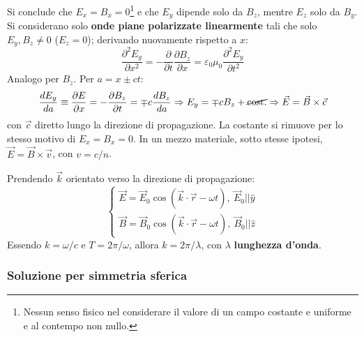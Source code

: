 \documentclass[a4paper]{scrartcl}
\numberwithin{equation}{subsection}
\theoremstyle{style1}
\begin{document}
Si conclude che $E_x=B_x = 0$\footnote{Nessun senso fisico nel considerare il valore di un campo costante e uniforme e al contempo non nullo.} e che $E_y$ dipende solo da $B_z$, mentre $E_z$ solo da $B_y$. Si considerano solo \textbf{onde piane polarizzate linearmente} tali che solo $E_y,B_z \neq 0$ ($E_z = 0$); derivando nuovamente rispetto a $x$:
\begin{equation}
	\frac{\partial ^2 E_y}{\partial x^2} = - \frac{\partial }{\partial t} \frac{\partial B_z}{\partial x} = \varepsilon _0 \mu _0 \frac{\partial ^2 E_y}{\partial t^2} 
\end{equation}
Analogo per $B_z$. Per $a=x\pm ct$:
\[
	\frac{d E_y}{d a} \equiv \frac{\partial E}{\partial x} = - \frac{\partial B_z}{\partial t} = \mp c \frac{d B_z}{d a} \Rightarrow E_y = \mp c B_z + \cancel{\text{cost.}}\Rightarrow \vec{E}=\vec{B}\times \vec{c}
\] 
con $\vec{c}$ diretto lungo la direzione di propagazione. La costante si rimuove per lo stesso motivo di $E_x=B_x=0$. In un mezzo materiale, sotto stesse ipotesi, $\vec{E}=\vec{B}\times \vec{v}$, con $v= c / n$.

Prendendo $\vec{k}$ orientato verso la direzione di propagazione:
\[
\begin{cases}
	\vec{E}=\vec{E}_0 \cos(\vec{k}\cdot \vec{r}-\omega t), \ \vec{E}_0 | | \hat{y}\\
	\vec{B}=\vec{B}_0 \cos(\vec{k}\cdot \vec{r}-\omega t), \ \vec{B}_0 | | \hat{z}
\end{cases}
\] 
Essendo $k=\omega / c$ e $T = 2\pi / \omega$, allora $k = 2\pi / \lambda $, con $\lambda $ \textbf{lunghezza d'onda}.
\subsubsection{Soluzione per simmetria sferica}
\end{document}
